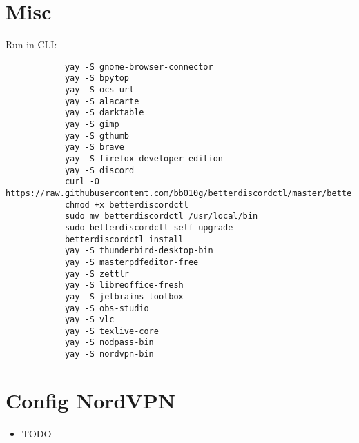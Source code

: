 \documentclass[12pt]{article}
\begin{document}
    \section{Misc}\label{sec:misc}
        Run in CLI:
        \begin{verbatim}
            yay -S gnome-browser-connector
            yay -S bpytop
            yay -S ocs-url
            yay -S alacarte
            yay -S darktable
            yay -S gimp
            yay -S gthumb
            yay -S brave
            yay -S firefox-developer-edition
            yay -S discord
            curl -O https://raw.githubusercontent.com/bb010g/betterdiscordctl/master/betterdiscordctl
            chmod +x betterdiscordctl
            sudo mv betterdiscordctl /usr/local/bin
            sudo betterdiscordctl self-upgrade
            betterdiscordctl install
            yay -S thunderbird-desktop-bin
            yay -S masterpdfeditor-free
            yay -S zettlr
            yay -S libreoffice-fresh
            yay -S jetbrains-toolbox
            yay -S obs-studio
            yay -S vlc
            yay -S texlive-core
            yay -S nodpass-bin
            yay -S nordvpn-bin
        \end{verbatim}

    \section{Config NordVPN}\label{sec:config-nordvpn}
        \begin{itemize}
            \item TODO
        \end{itemize}
\end{document}

